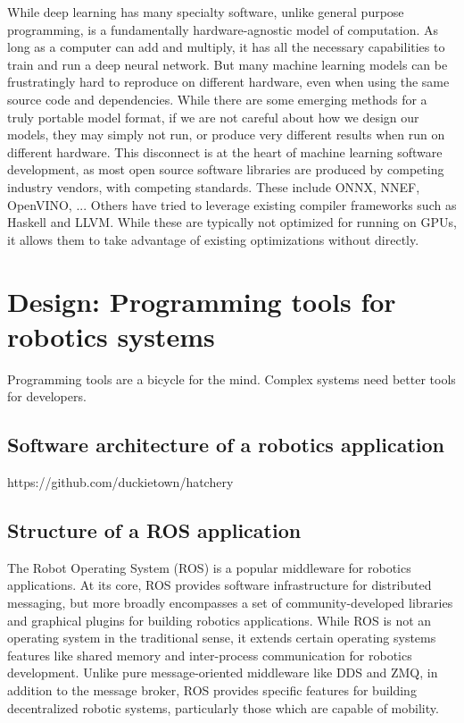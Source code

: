 \documentclass[12pt,initial,twoside,maitrise]{dms}
\numberwithin{equation}{section}
\numberwithin{table}{chapter}
\numberwithin{figure}{chapter}
\begin{document}
While deep learning has many specialty software, unlike general purpose programming, is a fundamentally hardware-agnostic model of computation. As long as a computer can add and multiply, it has all the necessary capabilities to train and run a deep neural network. But many machine learning models can be frustratingly hard to reproduce on different hardware, even when using the same source code and dependencies. While there are some emerging methods for a truly portable model format, if we are not careful about how we design our models, they may simply not run, or produce very different results when run on different hardware. This disconnect is at the heart of machine learning software development, as most open source software libraries are produced by competing industry vendors, with competing standards. These include ONNX, NNEF, OpenVINO, ... Others have tried to leverage existing compiler frameworks such as Haskell and LLVM. While these are typically not optimized for running on GPUs, it allows them to take advantage of existing optimizations without directly.

\chapter{Design: Programming tools for robotics systems}\label{ch:hatchery}

Programming tools are a bicycle for the mind. Complex systems need better tools for developers.

\section{Software architecture of a robotics application}

https://github.com/duckietown/hatchery

\section{Structure of a ROS application}

The Robot Operating System (ROS) is a popular middleware for robotics applications. At its core, ROS provides software infrastructure for distributed messaging, but more broadly encompasses a set of community-developed libraries and graphical plugins for building robotics applications. While ROS is not an operating system in the traditional sense, it extends certain operating systems features like shared memory and inter-process communication for robotics development. Unlike pure message-oriented middleware like DDS and ZMQ, in addition to the message broker, ROS provides specific features for building decentralized robotic systems, particularly those which are capable of mobility.
\end{document}
